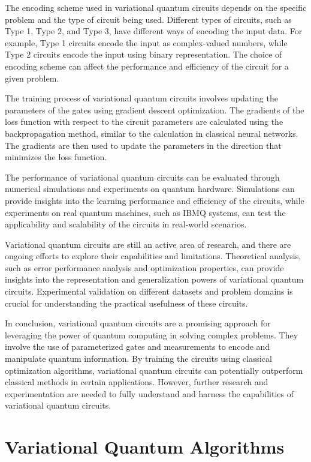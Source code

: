 \documentclass[pra,onecolumn,superscriptaddress]{revtex4}%
\begin{document}
The encoding scheme used in variational quantum circuits depends on the specific problem and the type of circuit being used. Different types of circuits, such as Type 1, Type 2, and Type 3, have different ways of encoding the input data. For example, Type 1 circuits encode the input as complex-valued numbers, while Type 2 circuits encode the input using binary representation. The choice of encoding scheme can affect the performance and efficiency of the circuit for a given problem.

The training process of variational quantum circuits involves updating the parameters of the gates using gradient descent optimization. The gradients of the loss function with respect to the circuit parameters are calculated using the backpropagation method, similar to the calculation in classical neural networks. The gradients are then used to update the parameters in the direction that minimizes the loss function.

The performance of variational quantum circuits can be evaluated through numerical simulations and experiments on quantum hardware. Simulations can provide insights into the learning performance and efficiency of the circuits, while experiments on real quantum machines, such as IBMQ systems, can test the applicability and scalability of the circuits in real-world scenarios.

Variational quantum circuits are still an active area of research, and there are ongoing efforts to explore their capabilities and limitations. Theoretical analysis, such as error performance analysis and optimization properties, can provide insights into the representation and generalization powers of variational quantum circuits. Experimental validation on different datasets and problem domains is crucial for understanding the practical usefulness of these circuits.

In conclusion, variational quantum circuits are a promising approach for leveraging the power of quantum computing in solving complex problems. They involve the use of parameterized gates and measurements to encode and manipulate quantum information. By training the circuits using classical optimization algorithms, variational quantum circuits can potentially outperform classical methods in certain applications. However, further research and experimentation are needed to fully understand and harness the capabilities of variational quantum circuits.

\section{Variational Quantum Algorithms}
\end{document}
